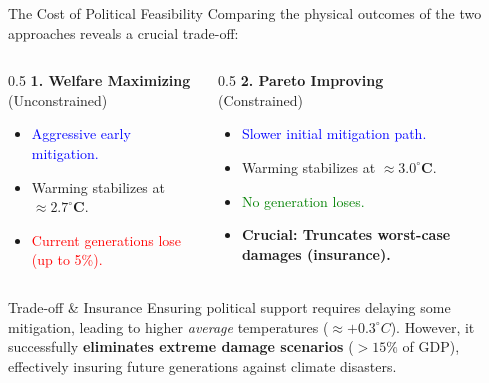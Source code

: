 \documentclass[10pt,aspectratio=169]{beamer}
\begin{document}
\begin{frame}{The Cost of Political Feasibility}
\small
    Comparing the physical outcomes of the two approaches reveals a crucial trade-off: \newline
    \begin{columns}[t]
        \begin{column}{0.5\textwidth}
            \textbf{1. Welfare Maximizing} \\ (Unconstrained)
            \begin{itemize}
                \item \textcolor{blue}{Aggressive early mitigation.}
                \item Warming stabilizes at $\mathbf{\approx 2.7^\circ C}$.
                \item \textcolor{red}{Current generations lose (up to 5\%).}
            \end{itemize}
        \end{column}
        \begin{column}{0.5\textwidth}
            \textbf{2. Pareto Improving} \\ (Constrained)
            \begin{itemize}
                \item \textcolor{blue}{Slower initial mitigation path.}
                \item Warming stabilizes at $\mathbf{\approx 3.0^\circ C}$.
                \item \textcolor{green}{No generation loses.}
                \item \textbf{\textcolor{uzhorange}{Crucial: Truncates worst-case damages (insurance).}}
            \end{itemize}
        \end{column}
    \end{columns}
    \vspace{0.8em}
    \begin{alertblock}{Trade-off \& Insurance}
        Ensuring political support requires delaying some mitigation, leading to higher \textit{average} temperatures ($\approx +0.3^\circ C$). However, it successfully \textbf{eliminates extreme damage scenarios} ($>15\%$ of GDP), effectively insuring future generations against climate disasters.
    \end{alertblock}
\end{frame}

\end{document}
